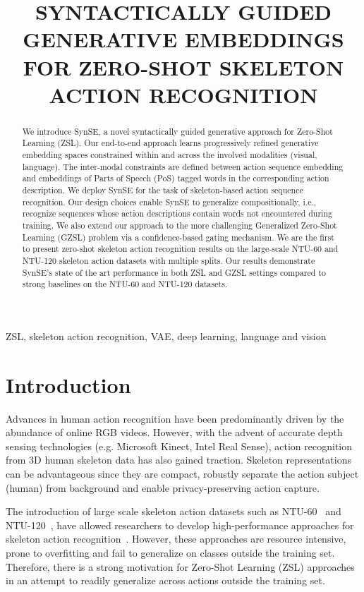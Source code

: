 \documentclass{article}
\title{SYNTACTICALLY GUIDED GENERATIVE EMBEDDINGS FOR ZERO-SHOT SKELETON ACTION RECOGNITION}
\begin{document}
\ninept
\maketitle
\begin{abstract}
We introduce SynSE, a novel syntactically guided generative approach for Zero-Shot Learning (ZSL). Our end-to-end approach learns progressively refined generative embedding spaces constrained within and across the involved modalities (visual, language). The inter-modal constraints are defined between action sequence embedding and embeddings of Parts of Speech (PoS) tagged words in the corresponding action description. We deploy SynSE for the task of skeleton-based action sequence recognition. Our design choices enable SynSE to generalize compositionally, i.e., recognize sequences whose action descriptions contain words not encountered during training. We also extend our approach to the more challenging Generalized Zero-Shot Learning (GZSL) problem via a confidence-based gating mechanism. We are the first to present zero-shot skeleton action recognition results on the large-scale NTU-60 and NTU-120 skeleton action datasets with multiple splits. Our results demonstrate SynSE's state of the art performance in both ZSL and GZSL settings compared to strong baselines on the NTU-60 and NTU-120 datasets. 
\end{abstract}

\begin{keywords}
ZSL, skeleton action recognition, VAE, deep learning, language and vision 
\end{keywords}

\section{Introduction}
\label{sec:intro}

Advances in human action recognition have been predominantly driven by the abundance of online RGB videos. However, with the advent of accurate depth sensing technologies (e.g. Microsoft Kinect, Intel Real Sense), action recognition from 3D human skeleton data has also gained traction. Skeleton representations can be advantageous since they are compact, robustly separate the action subject (human) from background and enable privacy-preserving action capture. 

The introduction of large scale skeleton action datasets such as NTU-60~\cite{shahroudy2016ntu} and NTU-120~\cite{liu2019ntu}, have allowed researchers to develop high-performance approaches for skeleton action recognition~\cite{cheng2020skeleton, liu2020disentangling, zhang2019view, shi2019two}. However, these approaches are resource intensive, prone to overfitting and fail to generalize on classes outside the training set. Therefore, there is a strong motivation for Zero-Shot Learning (ZSL) approaches in an attempt to readily generalize across actions outside the training set. 
\end{document}
